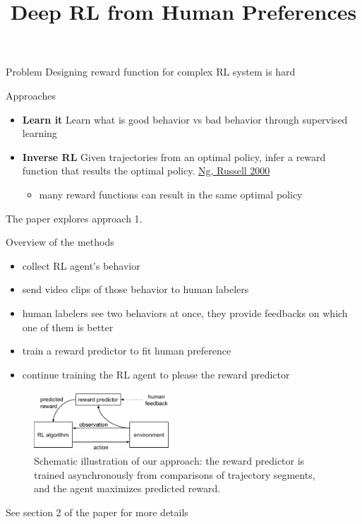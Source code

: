 \documentclass{beamer}
\title{Deep RL from Human Preferences}
\begin{document}
\frame{\titlepage}

\begin{frame}{Problem}
  Designing reward function for complex RL system is hard
\end{frame}

\begin{frame}{Approaches}
  \begin{itemize}
    \item \textbf{Learn it} Learn what is good behavior vs bad behavior through supervised learning
    \item \textbf{Inverse RL} Given trajectories from an optimal policy, infer a reward function that results 
      the optimal policy. 
      \href{https://ai.stanford.edu/~ang/papers/icml00-irl.pdf}{Ng, Russell 2000}
    \begin{itemize}
      \item many reward functions can result in the same optimal policy
    \end{itemize}
  \end{itemize}

  The paper explores approach 1.
\end{frame}

\begin{frame}{Overview of the methods}
  \begin{itemize}
    \item collect RL agent's behavior
    \item send video clips of those behavior to human labelers
    \item human labelers see two behaviors at once, they provide feedbacks
      on which one of them is better
    \item train a reward predictor to fit human preference
    \item continue training the RL agent to please the reward predictor
  \end{itemize}

\begin{figure}
\begin{center}
\includegraphics[width=0.45\textwidth]{setup.pdf}
\end{center}
\caption{Schematic illustration of our approach:
the reward predictor is trained asynchronously from comparisons of trajectory segments,
and the agent maximizes predicted reward.}
\label{fig:reward-feedback-schema}
\end{figure}

See section 2 of the paper for more details
\end{frame}
\end{document}
